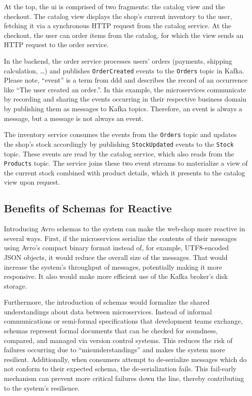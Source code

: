 At the top, the \gls{ui} is comprised of two fragments: the catalog view and the checkout.
The catalog view displays the shop's current inventory to the user, fetching it via a synchronous HTTP request from the catalog service.
At the checkout, the user can order items from the catalog, for which the view sends an HTTP request to the order service.

In the backend, the order service processes users' orders (payments, shipping calculation, \ldots) and publishes \texttt{OrderCreated} events to the \texttt{Orders} topic in Kafka.
Please note, \enquote{event} is a term from \gls{ddd} and describes the record of an occurrence like \enquote{The user created an order.}.
In this example, the microservices communicate by recording and sharing the events occurring in their respective business domain by publishing them as messages to Kafka topics.
Therefore, an event is always a message, but a message is not always an event.

The inventory service consumes the events from the \texttt{Orders} topic and updates the shop's stock accordingly by publishing \texttt{StockUpdated} events to the \texttt{Stock} topic.
These events are read by the catalog service, which also reads from the \texttt{Products} topic.
The service joins these two event streams to materialize a view of the current stock combined with product details, which it presents to the catalog view upon request.

\subsection{Benefits of Schemas for Reactive }\label{sec:schema-benefits}

Introducing Avro schemas to the system can make the web-shop more reactive in several ways.
First, if the microservices serialize the contents of their messages using Avro's compact binary format instead of, for example, UTF8-encoded JSON objects, it would reduce the overall size of the messages.
That would increase the system's throughput of messages, potentially making it more responsive.
It also would make more efficient use of the Kafka broker's disk storage.

Furthermore, the introduction of schemas would formalize the shared understandings about data between microservices.
Instead of informal communications or semi-formal specifications that development teams exchange, schemas represent formal documents that can be checked for soundness, compared, and managed via version control systems.
This reduces the risk of failures occurring due to \enquote{misunderstandings} and makes the system more resilient.
Additionally, when consumers attempt to de-serialize messages which do not conform to their expected schema, the de-serialization fails.
This fail-early mechanism can prevent more critical failures down the line, thereby contributing to the system's resilience.

